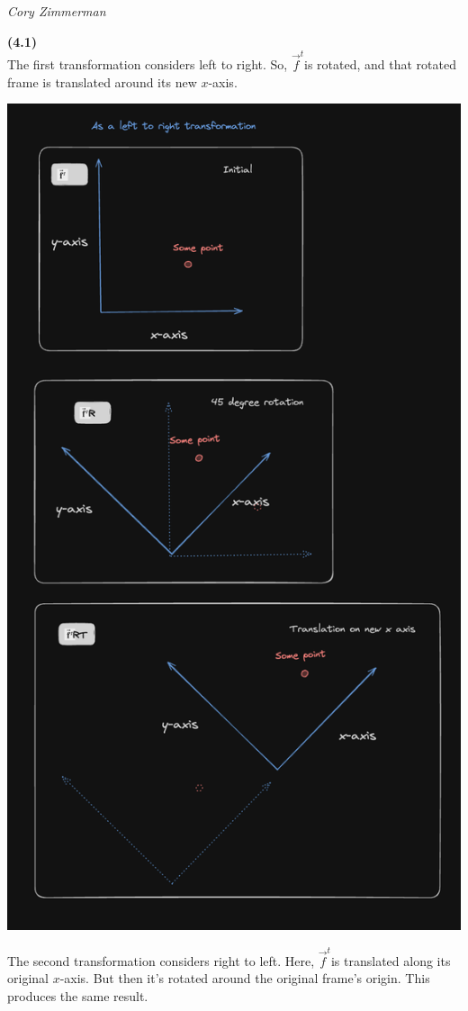 \documentclass[letterpaper, 11pt]{article}
\newcommand{\ft}{$\vec{f}^t$}
\begin{document}
\noindent \textit{Cory Zimmerman}
\medskip

\noindent \textbf{(4.1)} \\ 
The first transformation considers left to right. So, \ft is rotated, and that rotated frame is translated around its new $x$-axis. 

\medskip
\includegraphics[scale=0.6]{./pics/q1_ltr.png}

\newpage
\medskip
\noindent The second transformation considers right to left. Here, \ft is translated along its original $x$-axis. But then it's rotated around the original frame's origin. This produces the same result. 
\end{document}
